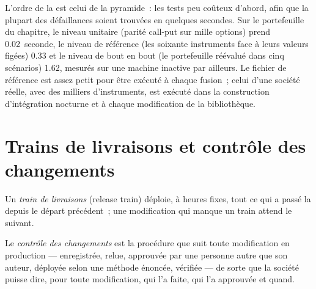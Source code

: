 L'ordre de la  est celui de la pyramide~: les tests peu coûteux d'abord, afin que la plupart des défaillances soient trouvées en quelques secondes. Sur le portefeuille du chapitre, le niveau unitaire
(parité call-put sur mille options) prend 0.02~seconde, le niveau de référence (les soixante instruments face à leurs valeurs figées) 0.33 et le
niveau de bout en bout (le portefeuille réévalué dans cinq scénarios) 1.62, mesurés sur une machine inactive par ailleurs. Le fichier de référence est assez petit pour être exécuté à chaque
fusion~; celui d'une société réelle, avec des milliers d'instruments, est exécuté dans la construction d'intégration nocturne et à chaque modification de la bibliothèque.

\section{Trains de livraisons et contrôle des changements}

\begin{definition}\label{def:pl:testing-and-continuous-delivery:train}
Un \emph{train de livraisons} (release train) déploie, à heures fixes, tout ce qui a passé la  depuis le départ précédent~; une
modification qui manque un train attend le suivant.
\end{definition}

\begin{definition}\label{def:pl:testing-and-continuous-delivery:change}
Le \emph{contrôle des changements} est la procédure que suit toute modification en production --- enregistrée, relue, approuvée par
une personne autre que son auteur, déployée selon une méthode énoncée, vérifiée --- de sorte que la société puisse dire, pour toute modification, qui l'a faite, qui l'a approuvée
et quand.
\end{definition}

